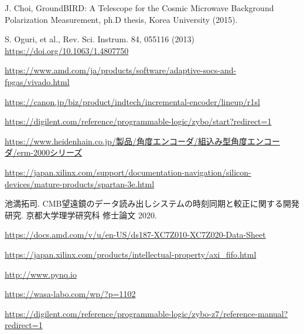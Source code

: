 \begin{thebibliography}{99}
J. Choi, GroundBIRD: A Telescope for the Cosmic Microwave Background Polarization Measurement, ph.D thesis, Korea University (2015).

S. Oguri, et al., Rev. Sci. Instrum. 84, 055116 (2013)
\href{https://doi.org/10.1063/1.4807750}{https://doi.org/10.1063/1.4807750}

\href{https://www.amd.com/ja/products/software/adaptive-socs-and-fpgas/vivado.html}{https://www.amd.com/ja/products/software/adaptive-socs-and-fpgas/vivado.html}

\href{https://canon.jp/biz/product/indtech/incremental-encoder/lineup/r1sl}{https://canon.jp/biz/product/indtech/incremental-encoder/lineup/r1sl}

\href{https://digilent.com/reference/programmable-logic/zybo/start?redirect=1}{https://digilent.com/reference/programmable-logic/zybo/start?redirect=1}

\href{https://www.heidenhain.co.jp/製品/角度エンコーダ/組込み型角度エンコーダ/erm-2000シリーズ}{https://www.heidenhain.co.jp/製品/角度エンコーダ/組込み型角度エンコーダ/erm-2000シリーズ}

\href{https://japan.xilinx.com/support/documentation-navigation/silicon-devices/mature-products/spartan-3e.html}{
https://japan.xilinx.com/support/documentation-navigation/silicon-devices/mature-products/spartan-3e.html}

池満拓司. CMB望遠鏡のデータ読み出しシステムの時刻同期と較正に関する開発研究. 京都大学理学研究科 修士論文 2020.

\href{https://docs.amd.com/v/u/en-US/ds187-XC7Z010-XC7Z020-Data-Sheet}{https://docs.amd.com/v/u/en-US/ds187-XC7Z010-XC7Z020-Data-Sheet}

\href{https://japan.xilinx.com/products/intellectual-property/axi\_fifo.html}{https://japan.xilinx.com/products/intellectual-property/axi\_fifo.html}

\href{http://www.pynq.io}{http://www.pynq.io}

\href{https://wasa-labo.com/wp/?p=1102}{https://wasa-labo.com/wp/?p=1102}

\href{https://digilent.com/reference/programmable-logic/zybo-z7/reference-manual?redirect=1}{https://digilent.com/reference/programmable-logic/zybo-z7/reference-manual?redirect=1}



\end{thebibliography}
